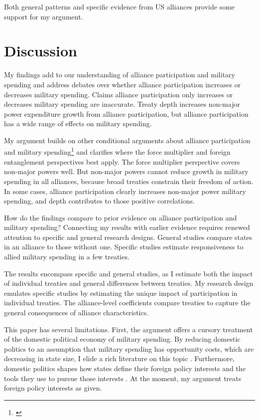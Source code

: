 \documentclass[12pt]{article}
\begin{document}
Both general patterns and specific evidence from US alliances provide some support for my argument. 



\section{Discussion}


My findings add to our understanding of alliance participation and military spending and address debates over whether alliance participation increases or decreases military spending. 
Claims alliance participation only increases or decreases military spending are inaccurate. 
Treaty depth increases non-major power expenditure growth from alliance participation, but alliance participation has a wide range of effects on military spending. 


My argument builds on other conditional arguments about alliance participation and military spending\footnote{\cite{DigiuseppePoast2016}} and clarifies where the force multiplier and foreign entanglement perspectives best apply. 
The force multiplier perspective covers non-major powers well. 
But non-major powers cannot reduce growth in military spending in all alliances, because broad treaties constrain their freedom of action.
In some cases, alliance participation clearly increases non-major power military spending, and depth contributes to those positive correlations. 


How do the findings compare to prior evidence on alliance participation and military spending? 
Connecting my results with earlier evidence requires renewed attention to specific and general research designs. 
General studies compare states in an alliance to those without one. 
Specific studies estimate responsiveness to allied military spending in a few treaties. 


The results encompass specific and general studies, as I estimate both the impact of individual treaties and general differences between treaties. 
My research design emulates specific studies by estimating the unique impact of participation in individual treaties. 
The alliance-level coefficients compare treaties to capture the general consequences of alliance characteristics. 


This paper has several limitations.
First, the argument offers a cursory treatment of the domestic political economy of military spending. 
By reducing domestic politics to an assumption that military spending has opportunity costs, which are decreasing in state size, I elide a rich literature on this topic \citep{WhittenWilliams2011, AlptekinLevine2012}.  
Furthermore, domestic politics shapes how states define their foreign policy interests and the tools they use to pursue those interests \citep{Fordham1998, Fordham2011, Narizny2007}. 
At the moment, my argument treats foreign policy interests as given.  
\end{document}
